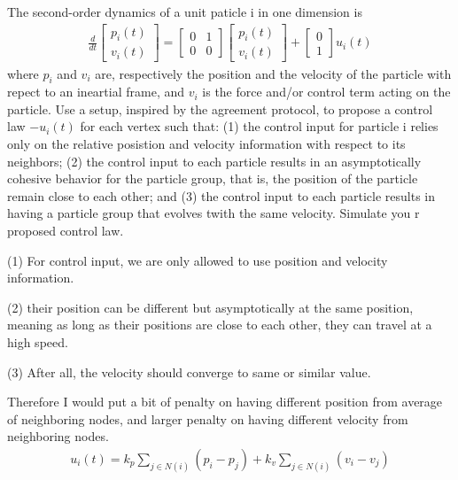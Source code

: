\documentclass{article}
\begin{document}
\begin{problem}
    The second-order dynamics of a unit paticle i in one dimension is 
    \begin{align*}
        \frac{d}{dt} 
        \begin{bmatrix*}
            p_i(t)\\
            v_i(t)  
        \end{bmatrix*}
        = \begin{bmatrix*}
            0 & 1\\
            0 & 0 
        \end{bmatrix*}
        \begin{bmatrix*}
            p_i(t)\\
            v_i(t)  
        \end{bmatrix*}
        + 
        \begin{bmatrix*}
            0\\
            1
        \end{bmatrix*} u_i(t)
    \end{align*}
    where $p_i$ and $v_i$ are, respectively the position and the velocity of the particle with repect to an ineartial frame, and $v_i$ is the force and/or control term acting on the particle. Use a setup, inspired by the agreement protocol, to propose a control law $-u_i(t)$ for each vertex such that: (1) the control input for particle i relies only on the relative posistion and velocity information with respect to its neighbors; (2) the control input to each particle results in an asymptotically cohesive behavior for the particle group, that is, the position of the particle remain close to each other; and (3) the control input to each particle results in having a particle group that evolves twith the same velocity. Simulate you r proposed control law.

    (1) For control input, we are only allowed to use position and velocity information.

    (2) their position can be different but asymptotically at the same position, meaning as long as their positions are close to each other, they can travel at a high speed.

    (3) After all, the velocity should converge to same or similar value. 

    Therefore I would put a bit of penalty on having different position from average of neighboring nodes, and larger penalty on having different velocity from neighboring nodes. 
    \begin{align*}
        u_i(t) = k_p \sum_{j \in N(i)}(p_i -  p_j) + k_v\sum_{j \in N(i)} (v_i -  v_j )
    \end{align*}
    

\end{problem}
\end{document}
